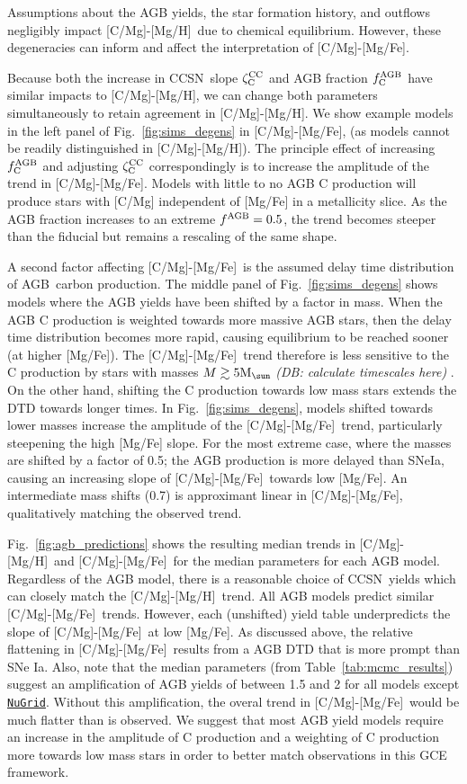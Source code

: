 \documentclass[fleqn,
usenatbib]{mnras}
\newcommand{\nugrid}{\texttt{\hyperlink{nugrid}{NuGrid}}}
\newcommand{\agb}{AGB}
\newcommand{\cc}{CCSN}
\newcommand{\caah}{[C/Mg]-[Mg/H]}
\newcommand{\caafe}{[C/Mg]-[Mg/Fe]}
\newcommand{\zcc}{\zeta_{\rm C}^{\rm CC}}
\newcommand{\fagb}{f_{\rm C}^{\rm AGB}}
\newcommand{\Mo}{ {\rm M}_{\sun}}
\newcommand{\dbnote}[1]{ {\color{Thistle} \textit{\small (DB: #1)}} }
\begin{document}
Assumptions about the AGB yields, the star formation history, and outflows negligibly impact \caah\ due to chemical equilibrium. However, these degeneracies can inform and affect the interpretation of \caafe. 

Because both the increase in \cc\ slope $\zcc$ and AGB fraction $\fagb$ have similar impacts to \caah, we can change both parameters simultaneously to retain agreement in \caah. We show example models in the left panel of Fig.~\ref{fig:sims_degens} in \caafe, (as models cannot be readily distinguished in \caah). The principle effect of increasing $\fagb$ and adjusting $\zcc$ correspondingly is to increase the amplitude of the trend in \caafe. Models with little to no AGB C production will produce stars with [C/Mg] independent of [Mg/Fe] in a metallicity slice. As the AGB fraction increases to an extreme $f^{\rm AGB}=0.5$, the trend becomes steeper than the fiducial but remains a rescaling of the same shape. 


A second factor affecting \caafe\ is the assumed delay time distribution of \agb\ carbon production.
The middle panel of Fig.~\ref{fig:sims_degens} shows models where the AGB yields have been shifted by a factor in mass. When the AGB C production is weighted towards more massive AGB stars, then the delay time distribution becomes more rapid, causing equilibrium to be reached sooner (at higher [Mg/Fe]). The \caafe\ trend therefore is less sensitive to the C production by stars with masses $M \gtrsim 5 \Mo$ \dbnote{calculate timescales here}. On the other hand, shifting the C production towards low mass stars extends the DTD towards longer times. In Fig.~\ref{fig:sims_degens}, models shifted towards lower masses increase the amplitude of the \caafe\ trend, particularly steepening the high [Mg/Fe] slope. For the most extreme case, where the masses are shifted by a factor of 0.5; the AGB production is more delayed than SNeIa, causing an increasing slope of \caafe\ towards low [Mg/Fe]. An intermediate mass shifts (0.7) is approximant linear in \caafe, qualitatively matching the observed trend. 

Fig.~\ref{fig:agb_predictions} shows the resulting median trends in \caah\ and \caafe\ for the median parameters for each AGB model. Regardless of the AGB model, there is a reasonable choice of \cc\ yields which can closely match the \caah\ trend. All AGB models predict similar \caafe\ trends. However, each (unshifted) yield table underpredicts the slope of \caafe\ at low [Mg/Fe]. As discussed above, the relative flattening in \caafe\ results from a AGB DTD that is more prompt than SNe Ia.
Also, note that the median parameters (from Table~\ref{tab:mcmc_results}) suggest an amplification of AGB yields of between 1.5 and 2 for all models except \nugrid. Without this amplification, the overal trend in \caafe\ would be much flatter than is observed. 
We suggest that most AGB yield models require an increase in the amplitude of C production and a weighting of C production more towards low mass stars in order to better match observations in this GCE framework.
\end{document}

